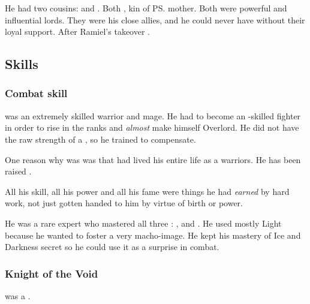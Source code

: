 He had two cousins: 
\Sargamel and \Themirod. 
Both \thelyadeth, kin of \ps{\Dasteron} mother. 
Both were powerful and influential \Mystraacht lords. 
They were his close allies, and he could never have  without their loyal support. 
After Ramiel's takeover . 









\subsection{Skills}





\subsubsection{Combat skill}
\Dasteron{} was an extremely skilled warrior and mage. 
He had to become an \uber-skilled fighter in order to rise in the \Mystraacht{} ranks and \emph{almost} make himself Overlord. 
He did not have the raw strength of a \sathariah, so he trained to compensate. 

One reason why \Dasteron{} was  was that \Dasteron{} had lived his entire life as a \Mystraacht{} warriors. 
He has been raised . 

All his skill, all his power and all his fame were things he had \emph{earned} by hard work, not just gotten handed to him by virtue of birth or \sathariah{} power. 

He was a rare expert who mastered all three : 
,  and . 
He used mostly Light because he wanted to foster a very \Mystraacht{} macho-image. 
He kept his mastery of Ice and Darkness secret so he could use it as a surprise in combat. 





\subsubsection{Knight of the Void}
\Dasteron was a .





